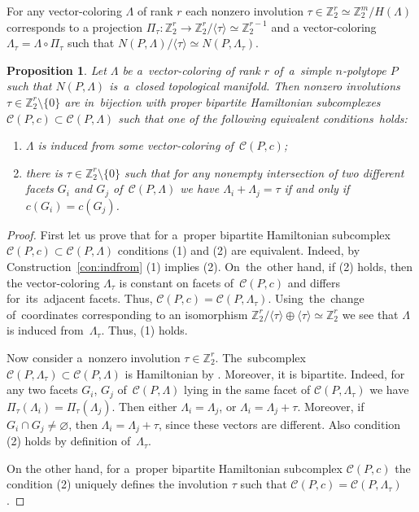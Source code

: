 \documentclass[12pt]{amsart}
\newtheorem{proposition}[formula]{Proposition}
\theoremstyle{definition}
\theoremstyle{remark}
\begin{document}
For any vector-coloring  $\Lambda$ of rank $r$ each 
nonzero involution $\tau\in \mathbb Z_2^r\simeq\mathbb Z_2^m/H(\Lambda)$
corresponds to a projection $\Pi_{\tau}\colon \mathbb Z_2^r\to\mathbb Z_2^r/\langle \tau\rangle\simeq \mathbb Z_2^{r-1}$
and a vector-coloring $\Lambda_\tau=\Lambda\circ\Pi_\tau$ such that 
$N(P,\Lambda)/\langle\tau\rangle\simeq N(P,\Lambda_\tau)$. 

\begin{proposition} \label{propo:taubpH}
Let $\Lambda$ be a~vector-coloring of rank $r$ of~a~simple $n$-polytope $P$ such that $N(P,\Lambda)$
is~a~closed topological manifold. Then nonzero involutions 
$\tau\in \mathbb Z_2^r\setminus\{0\}$ %
are in~bijection with proper bipartite Hamiltonian subcomplexes $\mathcal{C}(P,c)\subset\mathcal{C}(P,\Lambda)$
such that one of the following equivalent conditions~holds:
\begin{enumerate}
\item $\Lambda$ is induced from some vector-coloring of~$\mathcal{C}(P,c)$;
\item there is $\tau\in \mathbb Z_2^r\setminus\{0\}$ such that 
for any nonempty intersection of two different facets $G_i$ and $G_j$ of~$\mathcal{C}(P,\Lambda)$
we have $\Lambda_i+\Lambda_j=\tau$ if and only if $c(G_i)=c(G_j)$.
\end{enumerate}
\end{proposition}
\begin{proof}
First let us prove that for a~proper bipartite Hamiltonian subcomplex 
$\mathcal{C}(P,c)\subset\mathcal{C}(P,\Lambda)$ conditions (1) and (2) are equivalent. 
Indeed, by Construction~\ref{con:indfrom} (1) implies (2).
On~the~other hand, if (2) holds, then the vector-coloring $\Lambda_\tau$ is constant on facets of~$\mathcal{C}(P,c)$
and differs for~its~adjacent facets. Thus, $\mathcal{C}(P,c)=\mathcal{C}(P,\Lambda_\tau)$.
Using~the~change of~coordinates corresponding to an isomorphism 
$\mathbb Z_2^r/\langle\tau\rangle\oplus\langle\tau\rangle\simeq \mathbb Z_2^r$ we see that 
$\Lambda$ is induced from~$\Lambda_\tau$. Thus, (1) holds.

Now consider a~nonzero involution $\tau\in \mathbb Z_2^r$. The~subcomplex  
$\mathcal{C}(P,\Lambda_\tau)\subset \mathcal{C}(P,\Lambda)$
is Hamiltonian by \cite[Proposition 5.12]{E24}. Moreover, it is bipartite. Indeed, for any two 
facets $G_i$, $G_j$ of~$\mathcal{C}(P,\Lambda)$ lying in the same facet of $\mathcal{C}(P,\Lambda_\tau)$
we have $\Pi_\tau(\Lambda_i)=\Pi_\tau(\Lambda_j)$. Then either $\Lambda_i=\Lambda_j$, or $\Lambda_i=\Lambda_j+\tau$.
Moreover, if $G_i\cap G_j\ne\varnothing$, then $\Lambda_i=\Lambda_j+\tau$, since these vectors are different.
Also condition (2) holds by definition of~$\Lambda_\tau$.

On the other hand, for a~proper bipartite Hamiltonian subcomplex $\mathcal{C}(P,c)$ the condition (2) uniquely 
defines the involution $\tau$ such that $\mathcal{C}(P,c)=\mathcal{C}(P,\Lambda_\tau)$.
\end{proof}
\end{document}
